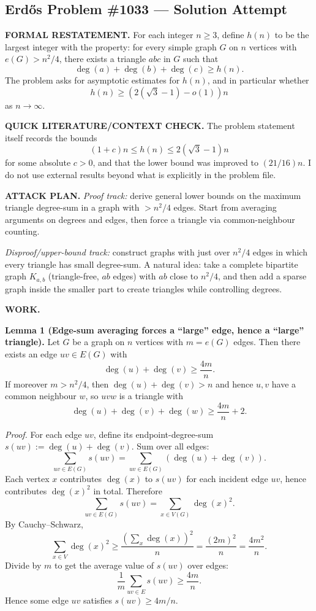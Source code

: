 \subsection*{Erd\H{o}s Problem \#1033 --- Solution Attempt}

\textbf{FORMAL RESTATEMENT.}
For each integer $n\ge 3$, define $h(n)$ to be the largest integer with the property:
for every simple graph $G$ on $n$ vertices with $e(G) > n^2/4$, there exists a triangle $abc$ in $G$ such that
\[
\deg(a)+\deg(b)+\deg(c) \ge h(n).
\]
The problem asks for asymptotic estimates for $h(n)$, and in particular whether
\[
 h(n) \ge (2(\sqrt{3}-1)-o(1))n
\]
as $n\to\infty$.

\textbf{QUICK LITERATURE/CONTEXT CHECK.}
The problem statement itself records the bounds
\[
(1+c)n \le h(n) \le 2(\sqrt{3}-1)n
\]
for some absolute $c>0$, and that the lower bound was improved to $(21/16)n$.
I do not use external results beyond what is explicitly in the problem file.

\textbf{ATTACK PLAN.}
\emph{Proof track:} derive general lower bounds on the maximum triangle degree-sum in a graph with $>n^2/4$ edges.
Start from averaging arguments on degrees and edges, then force a triangle via common-neighbour counting.

\emph{Disproof/upper-bound track:} construct graphs with just over $n^2/4$ edges in which every triangle has small degree-sum.
A natural idea: take a complete bipartite graph $K_{a,b}$ (triangle-free, $ab$ edges) with $ab$ close to $n^2/4$, and then add a sparse graph inside the smaller part to create triangles while controlling degrees.

\textbf{WORK.}

\textbf{Lemma 1 (Edge-sum averaging forces a ``large'' edge, hence a ``large'' triangle).}
Let $G$ be a graph on $n$ vertices with $m=e(G)$ edges.
Then there exists an edge $uv\in E(G)$ with
\[
\deg(u)+\deg(v) \ge \frac{4m}{n}.
\]
If moreover $m>n^2/4$, then $\deg(u)+\deg(v) > n$ and hence $u,v$ have a common neighbour $w$, so $uvw$ is a triangle with
\[
\deg(u)+\deg(v)+\deg(w) \ge \frac{4m}{n} + 2.
\]

\emph{Proof.}
For each edge $uv$, define its endpoint-degree-sum $s(uv):=\deg(u)+\deg(v)$.
Sum over all edges:
\[
\sum_{uv\in E(G)} s(uv) = \sum_{uv\in E(G)} (\deg(u)+\deg(v)).
\]
Each vertex $x$ contributes $\deg(x)$ to $s(uv)$ for each incident edge $uv$, hence contributes $\deg(x)^2$ in total.
Therefore
\[
\sum_{uv\in E(G)} s(uv) = \sum_{x\in V(G)} \deg(x)^2.
\]
By Cauchy--Schwarz,
\[
\sum_{x\in V} \deg(x)^2 \ge \frac{\left(\sum_x \deg(x)\right)^2}{n} = \frac{(2m)^2}{n} = \frac{4m^2}{n}.
\]
Divide by $m$ to get the average value of $s(uv)$ over edges:
\[
\frac{1}{m}\sum_{uv\in E} s(uv) \ge \frac{4m}{n}.
\]
Hence some edge $uv$ satisfies $s(uv)\ge 4m/n$.

